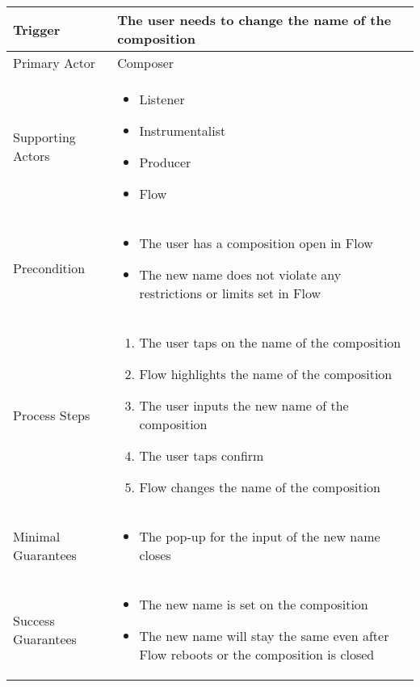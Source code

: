\begin{longtable}{|X|X|}
\hline
Trigger & 
The user needs to change the name of the composition \\
\hline
Primary Actor & 
Composer \\
\hline
Supporting Actors & 
\begin{itemize}
\item Listener
\item Instrumentalist
\item Producer
\item Flow
\end{itemize} \\
\hline
Precondition & 
\begin{itemize}
\item The user has a composition open in Flow
\item The new name does not violate any restrictions or limits set in Flow
\end{itemize} \\
\hline
Process Steps & 
\begin{enumerate}
\item The user taps on the name of the composition
\item Flow highlights the name of the composition
\item The user inputs the new name of the composition
\item The user taps confirm
\item Flow changes the name of the composition
\end{enumerate} \\
\hline
Minimal Guarantees & 
\begin{itemize}
  \item The pop-up for the input of the new name closes
\end{itemize} \\
\hline
Success Guarantees & 
\begin{itemize}
  \item The new name is set on the composition
  \item The new name will stay the same even after Flow reboots or the composition is closed
\end{itemize} \\
\hline
\end{longtable}